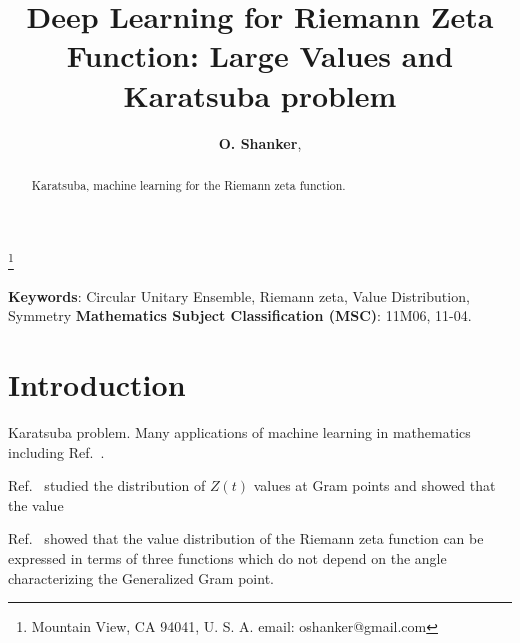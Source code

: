 \documentclass[twoside]{article}
\begin{document}


\newtheorem{theorem}{Theorem}[section]
\newtheorem{lemma}[theorem]{Lemma}

\theoremstyle{definition}
\newtheorem{definition}[theorem]{Definition}
\newtheorem{example}[theorem]{Example}
\newtheorem{xca}[theorem]{Exercise}

\theoremstyle{remark}
\newtheorem{remark}[theorem]{Remark}



\date{}
\lhead[]{}
\rhead[]{}

\title{\bf{Deep Learning for Riemann Zeta Function: Large Values and Karatsuba problem}}

\maketitle


\author{{\textbf{O. Shanker}},}
\thanks{ Mountain View, CA 94041, U. S. A. email: oshanker@gmail.com}

\thispagestyle{fancy}

\begin{abstract}
Karatsuba, machine learning for 
the Riemann zeta function.
\end{abstract}
{\textbf {Keywords}:} Circular Unitary Ensemble, Riemann zeta, Value Distribution, Symmetry 
{\textbf {Mathematics Subject Classification (MSC)}:} 11M06, 11-04.


\symbolfootnote[0]{*}


\section{Introduction}

Karatsuba problem.  Many applications of machine learning in mathematics including Ref.~\cite{osneural}.


Ref.~\cite{Shanker 2018a,Shanker 2018b} studied 
the distribution of $Z(t)$ values 
at Gram points and showed  that  the  value

Ref.~\cite{Shanker 2020} showed that the value distribution of the Riemann zeta function 
can be expressed in terms of three  functions 
 which do not depend on the angle characterizing the Generalized Gram point. 
\end{document}
